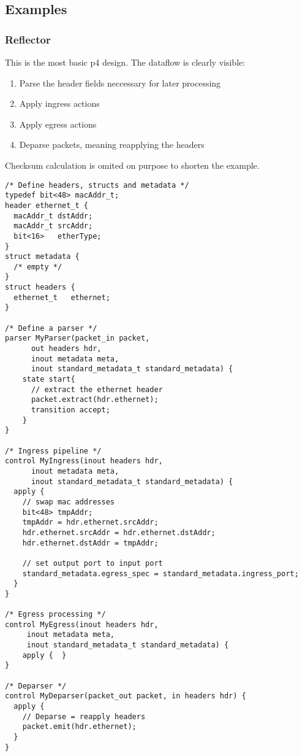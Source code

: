 \documentclass[a4paper, fontsize=8pt, landscape, DIV=1]{scrartcl}
\begin{document}
\begin{multicols*}{3}
  \subsection{Examples}

  \subsubsection{Reflector}
  This is the most basic p4 design. The dataflow is clearly visible:

  \begin{enumerate}
    \item Parse the header fields neccessary for later processing
    \item Apply ingress actions
    \item Apply egress actions
    \item Deparse packets, meaning reapplying the headers
  \end{enumerate}

  Checksum calculation is omited on purpose to shorten the example.

  \begin{lstlisting}[style=P4style]
/* Define headers, structs and metadata */
typedef bit<48> macAddr_t;
header ethernet_t {
  macAddr_t dstAddr;
  macAddr_t srcAddr;
  bit<16>   etherType;
}
struct metadata {
  /* empty */
}
struct headers {
  ethernet_t   ethernet;
}

/* Define a parser */
parser MyParser(packet_in packet,
      out headers hdr,
      inout metadata meta,
      inout standard_metadata_t standard_metadata) {
    state start{
      // extract the ethernet header
      packet.extract(hdr.ethernet);
      transition accept;
    }
}

/* Ingress pipeline */
control MyIngress(inout headers hdr,
      inout metadata meta,
      inout standard_metadata_t standard_metadata) {
  apply {
    // swap mac addresses
    bit<48> tmpAddr;
    tmpAddr = hdr.ethernet.srcAddr;
    hdr.ethernet.srcAddr = hdr.ethernet.dstAddr;
    hdr.ethernet.dstAddr = tmpAddr;

    // set output port to input port
    standard_metadata.egress_spec = standard_metadata.ingress_port;
  }
}

/* Egress processing */
control MyEgress(inout headers hdr,
     inout metadata meta,
     inout standard_metadata_t standard_metadata) {
    apply {  }
}

/* Deparser */
control MyDeparser(packet_out packet, in headers hdr) {
  apply {
    // Deparse = reapply headers
    packet.emit(hdr.ethernet);
  }
}


\end{lstlisting}
\end{multicols*}
\end{document}

